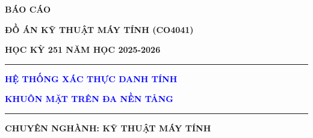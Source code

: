\begin{titlepage}
\begin{center}
                                                                                                                                                        \textbf{BÁO CÁO}

                                                                                                                                                            \textbf{ĐỒ ÁN KỸ THUẬT MÁY TÍNH (CO4041)}

                                                                                                                                                                \textbf{HỌC KỲ 251 NĂM HỌC 2025-2026}

                                                                                                                                                                    \rule{0.8\textwidth}{0.5pt}

                                                                                                                                                                            \fontsize{20pt}{18pt}\selectfont
                                                                                                                                                                                \textcolor{blue}{\textbf{\MakeUppercase{Hệ thống xác thực danh tính}}}

                                                                                                                                                                                    \textcolor{blue}{\textbf{\MakeUppercase{KHUÔN MẶT TRÊN ĐA NỀN TẢNG}}}

                                                                                                                                                                                        \vspace{-0.3cm}

                                                                                                                                                                                                \rule{0.8\textwidth}{0.5pt}

                                                                                                                                                                                                    \vspace{0.4cm}

                                                                                                                                                                                                        \fontsize{15pt}{18pt}\selectfont
                                                                                                                                                                                                            \textbf{CHUYÊN NGHÀNH: KỸ THUẬT MÁY TÍNH}


\end{center}
\end{titlepage}
